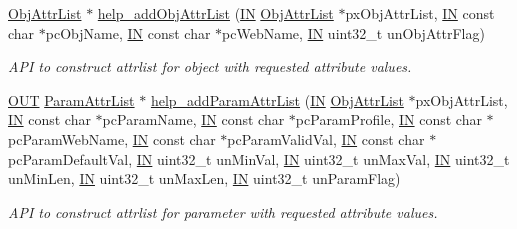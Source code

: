 \begin{DoxyCompactItemize}
\hyperlink{structObjAttrList}{Obj\-Attr\-List} $\ast$ \hyperlink{group__LIBHELP_ga204faa57d7e26b64539efa41793e243a}{help\-\_\-add\-Obj\-Attr\-List} (\hyperlink{group__LIBHELP_gac2bbd6d630a06a980d9a92ddb9a49928}{I\-N} \hyperlink{structObjAttrList}{Obj\-Attr\-List} $\ast$px\-Obj\-Attr\-List, \hyperlink{group__LIBHELP_gac2bbd6d630a06a980d9a92ddb9a49928}{I\-N} const char $\ast$pc\-Obj\-Name, \hyperlink{group__LIBHELP_gac2bbd6d630a06a980d9a92ddb9a49928}{I\-N} const char $\ast$pc\-Web\-Name, \hyperlink{group__LIBHELP_gac2bbd6d630a06a980d9a92ddb9a49928}{I\-N} uint32\-\_\-t un\-Obj\-Attr\-Flag)
\begin{DoxyCompactList}\small\item\em A\-P\-I to construct attrlist for object with requested attribute values. \end{DoxyCompactList}\item 
\hyperlink{group__LIBHELP_gaec78e7a9e90a406a56f859ee456e8eae}{O\-U\-T} \hyperlink{structParamAttrList}{Param\-Attr\-List} $\ast$ \hyperlink{group__LIBHELP_gaa179c3f390f7087bee64eeac354dfb3d}{help\-\_\-add\-Param\-Attr\-List} (\hyperlink{group__LIBHELP_gac2bbd6d630a06a980d9a92ddb9a49928}{I\-N} \hyperlink{structObjAttrList}{Obj\-Attr\-List} $\ast$px\-Obj\-Attr\-List, \hyperlink{group__LIBHELP_gac2bbd6d630a06a980d9a92ddb9a49928}{I\-N} const char $\ast$pc\-Param\-Name, \hyperlink{group__LIBHELP_gac2bbd6d630a06a980d9a92ddb9a49928}{I\-N} const char $\ast$pc\-Param\-Profile, \hyperlink{group__LIBHELP_gac2bbd6d630a06a980d9a92ddb9a49928}{I\-N} const char $\ast$pc\-Param\-Web\-Name, \hyperlink{group__LIBHELP_gac2bbd6d630a06a980d9a92ddb9a49928}{I\-N} const char $\ast$pc\-Param\-Valid\-Val, \hyperlink{group__LIBHELP_gac2bbd6d630a06a980d9a92ddb9a49928}{I\-N} const char $\ast$pc\-Param\-Default\-Val, \hyperlink{group__LIBHELP_gac2bbd6d630a06a980d9a92ddb9a49928}{I\-N} uint32\-\_\-t un\-Min\-Val, \hyperlink{group__LIBHELP_gac2bbd6d630a06a980d9a92ddb9a49928}{I\-N} uint32\-\_\-t un\-Max\-Val, \hyperlink{group__LIBHELP_gac2bbd6d630a06a980d9a92ddb9a49928}{I\-N} uint32\-\_\-t un\-Min\-Len, \hyperlink{group__LIBHELP_gac2bbd6d630a06a980d9a92ddb9a49928}{I\-N} uint32\-\_\-t un\-Max\-Len, \hyperlink{group__LIBHELP_gac2bbd6d630a06a980d9a92ddb9a49928}{I\-N} uint32\-\_\-t un\-Param\-Flag)
\begin{DoxyCompactList}\small\item\em A\-P\-I to construct attrlist for parameter with requested attribute values. \end{DoxyCompactList}\item 

\end{DoxyCompactItemize}
